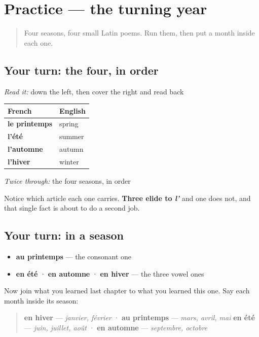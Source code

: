 \section[Practice]{Practice — the turning year}

\label{lesson:FR-C09-saisons-practice}



\begin{quote}
Four seasons, four small Latin poems. Run them, then put a month inside each one.
\end{quote}

\subsection*{Your turn: the four, in order}
\emph{Read it:} down the left, then cover the right and read back

\noindent
\begin{tabularx}{\linewidth}{@{}>{\raggedright\arraybackslash}X>{\raggedright\arraybackslash}X@{}}
\toprule
\textbf{French} & \textbf{English} \\
\midrule
\textbf{le printemps} & spring \\
\textbf{l'été} & summer \\
\textbf{l'automne} & autumn \\
\textbf{l'hiver} & winter \\
\bottomrule
\end{tabularx}

\emph{Twice through:} the four seasons, in order

Notice which article each one carries. \textbf{Three elide to \emph{l'}} and one does not, and that single fact is about to do a second job.

\subsection*{Your turn: in a season}
\begin{itemize}
\raggedright
  \item \textbf{au printemps} — the consonant one
  \item \textbf{en été} · \textbf{en automne} · \textbf{en hiver} — the three vowel ones
\end{itemize}

Now join what you learned last chapter to what you learned this one. Say each month inside its season:

\begin{quote}
\textbf{en hiver} — \emph{janvier, février} · \textbf{au printemps} — \emph{mars, avril, mai} \textbf{en été} — \emph{juin, juillet, août} · \textbf{en automne} — \emph{septembre, octobre}
\end{quote}

